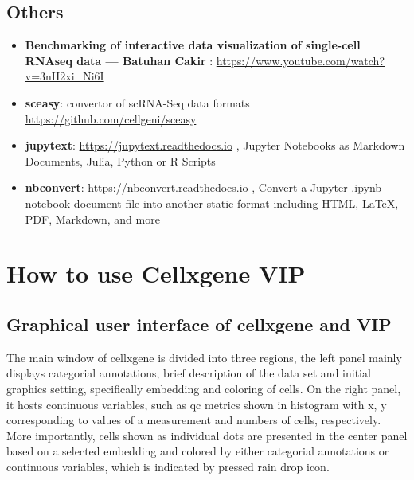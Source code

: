 \documentclass[
]{article}
\providecommand{\tightlist}{%
  \setlength{\itemsep}{0pt}\setlength{\parskip}{0pt}}
\begin{document}
\hypertarget{others}{%
\subsection*{Others}\label{others}}

\begin{itemize}
\tightlist
\item
  \textbf{Benchmarking of interactive data visualization of single-cell RNAseq data --- Batuhan Cakir} : \url{https://www.youtube.com/watch?v=3nH2xi_Ni6I}
\item
  \textbf{sceasy}: convertor of scRNA-Seq data formats \url{https://github.com/cellgeni/sceasy}
\item
  \textbf{jupytext}: \url{https://jupytext.readthedocs.io} , Jupyter Notebooks as Markdown Documents, Julia, Python or R Scripts
\item
  \textbf{nbconvert}: \url{https://nbconvert.readthedocs.io} , Convert a Jupyter .ipynb notebook document file into another static format including HTML, LaTeX, PDF, Markdown, and more
\end{itemize}

\hypertarget{how-to-use-cellxgene-vip}{%
\section{How to use Cellxgene VIP}\label{how-to-use-cellxgene-vip}}

\hypertarget{graphical-user-interface-of-cellxgene-and-vip}{%
\subsection{Graphical user interface of cellxgene and VIP}\label{graphical-user-interface-of-cellxgene-and-vip}}

The main window of cellxgene is divided into three regions, the left panel mainly displays categorial
annotations, brief description of the data set and initial graphics setting, specifically embedding and
coloring of cells. On the right panel, it hosts continuous variables, such as qc metrics shown in histogram
with x, y corresponding to values of a measurement and numbers of cells, respectively. More
importantly, cells shown as individual dots are presented in the center panel based on a selected
embedding and colored by either categorial annotations or continuous variables, which is indicated by
pressed rain drop icon.
\end{document}

